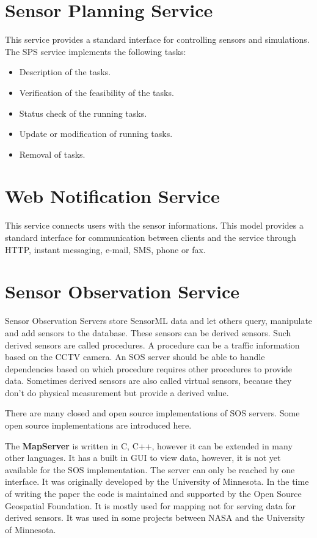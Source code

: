 \section{Sensor Planning Service}
 
 This service provides a standard interface for controlling sensors and simulations. The SPS service implements the following tasks:
 \begin{itemize}
\item Description of the tasks.
\item Verification of the feasibility of the tasks.
\item Status check of the running tasks.
\item Update or modification of running tasks.
\item Removal of tasks.
\end{itemize}

\section{Web Notification Service}
This service connects users with the sensor informations. This model provides a standard interface for communication between clients and the service through HTTP, instant messaging, e-mail, SMS, phone or fax. 
 
 
\section{Sensor Observation Service}

Sensor Observation Servers store SensorML data and let others query, manipulate and add sensors to the database. These sensors can be derived sensors. Such derived sensors are called procedures. A procedure can be a traffic information based on the CCTV camera. An SOS server should be able to handle dependencies based on which procedure requires other procedures to provide data. Sometimes derived sensors are also called virtual sensors, because they don't do physical measurement but provide a derived value.

There are many closed and open source implementations of SOS servers. Some open source implementations are introduced here.

The \textbf{MapServer} is written in C, C++, however it can be extended in many other languages\cite{mapserver}. It has a built in GUI to view data, however, it is not yet available for the SOS implementation. The server can only be reached by one interface. It was originally developed by the University of Minnesota. In the time of writing the paper the code is maintained and supported by the Open Source Geospatial Foundation. It is mostly used for mapping not for serving data for derived sensors. It was used in some projects between NASA and the University of Minnesota. 


